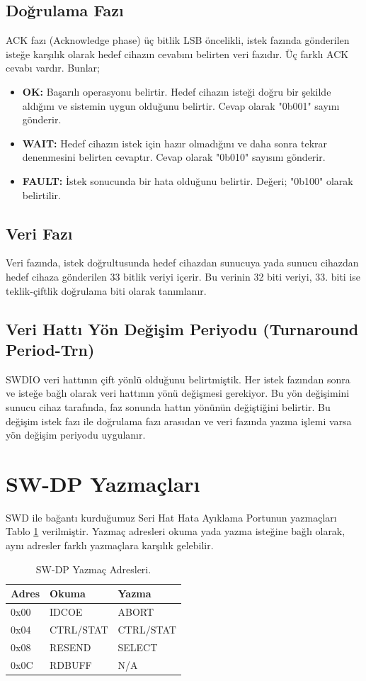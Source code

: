 \subsection{Doğrulama Fazı}
ACK fazı (Acknowledge phase) üç bitlik \acrfull{LSB} öncelikli, istek fazında gönderilen isteğe karşılık olarak hedef cihazın cevabını belirten veri fazıdır.
Üç farklı ACK cevabı vardır. Bunlar;
\begin{itemize}
	\item \textbf{OK:} Başarılı operasyonu belirtir. Hedef cihazın isteği doğru bir şekilde aldığını ve sistemin uygun olduğunu belirtir. Cevap olarak "0b001" sayını gönderir.
	\item \textbf{WAIT:} Hedef cihazın istek için hazır olmadığını ve daha sonra tekrar denenmesini belirten cevaptır. Cevap olarak "0b010" sayısını gönderir.
	\item \textbf{FAULT:} İstek sonucunda bir hata olduğunu belirtir. Değeri; "0b100" olarak belirtilir.
\end{itemize}

\subsection{Veri Fazı}

Veri fazında, istek doğrultusunda hedef cihazdan sunucuya yada sunucu cihazdan hedef cihaza gönderilen 33 bitlik veriyi içerir. Bu verinin 32 biti veriyi, 33. biti ise teklik-çiftlik doğrulama biti olarak tanımlanır.

\subsection{Veri Hattı Yön Değişim Periyodu (Turnaround Period-Trn)}

SWDIO veri hattının çift yönlü olduğunu belirtmiştik. Her istek fazından sonra ve isteğe bağlı olarak veri hattının yönü değişmesi gerekiyor. Bu yön değişimini sunucu cihaz tarafında, faz sonunda hattın yönünün değiştiğini belirtir.
Bu değişim istek fazı ile doğrulama fazı arasıdan ve veri fazında yazma işlemi varsa yön değişim periyodu uygulanır.

\section{SW-DP Yazmaçları}

SWD ile bağantı kurduğumuz Seri Hat Hata Ayıklama Portunun yazmaçları Tablo \ref{tab:SwDpReg} verilmiştir. Yazmaç adresleri okuma yada yazma isteğine bağlı olarak, aynı adresler farklı yazmaçlara karşılık gelebilir.
\begin{table}[h]
\centering
\caption{SW-DP Yazmaç Adresleri.}\label{tab:SwDpReg}
\begin{tabular}{|l|l|l|}
	\hline
	Adres	& Okuma	& Yazma \\ \hline
	0x00	& IDCOE & ABORT \\ \hline
	0x04	& CTRL/STAT & CTRL/STAT \\ \hline
	0x08	& RESEND & SELECT \\ \hline
	0x0C	& RDBUFF & N/A \\ \hline
\end{tabular}
\end{table}

